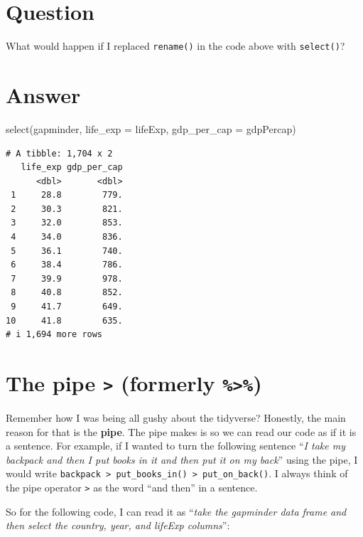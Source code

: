 \documentclass[
  letterpaper,
  DIV=11,
  numbers=noendperiod]{scrreprt}
\newenvironment{Shaded}{\begin{snugshade}}{\end{snugshade}}
\newcommand{\AttributeTok}[1]{\textcolor[rgb]{0.40,0.45,0.13}{#1}}
\newcommand{\FunctionTok}[1]{\textcolor[rgb]{0.28,0.35,0.67}{#1}}
\newcommand{\NormalTok}[1]{\textcolor[rgb]{0.00,0.23,0.31}{#1}}
\begin{document}
\section{Question}

What would happen if I replaced \texttt{rename()} in the code above with
\texttt{select()}?

\section{Answer}

\begin{Shaded}
\begin{Highlighting}[]
\FunctionTok{select}\NormalTok{(gapminder, }\AttributeTok{life\_exp =}\NormalTok{ lifeExp, }\AttributeTok{gdp\_per\_cap =}\NormalTok{ gdpPercap)}
\end{Highlighting}
\end{Shaded}

\begin{verbatim}
# A tibble: 1,704 x 2
   life_exp gdp_per_cap
      <dbl>       <dbl>
 1     28.8        779.
 2     30.3        821.
 3     32.0        853.
 4     34.0        836.
 5     36.1        740.
 6     38.4        786.
 7     39.9        978.
 8     40.8        852.
 9     41.7        649.
10     41.8        635.
# i 1,694 more rows
\end{verbatim}

\section{\texorpdfstring{The pipe \texttt{\textbar{}\textgreater{}}
(formerly
\texttt{\%\textgreater{}\%})}{The pipe \textbar\textgreater{} (formerly \%\textgreater\%)}}\label{the-pipe-formerly}

Remember how I was being all gushy about the tidyverse? Honestly, the
main reason for that is the \textbf{pipe}. The pipe makes is so we can
read our code as if it is a sentence. For example, if I wanted to turn
the following sentence ``\emph{I take my backpack and then I put books
in it and then put it on my back}'' using the pipe, I would write
\texttt{backpack\ \textbar{}\textgreater{}\ put\_books\_in()\ \textbar{}\textgreater{}\ put\_on\_back()}.
I always think of the pipe operator \texttt{\textbar{}\textgreater{}} as
the word ``and then'' in a sentence.

So for the following code, I can read it as ``\emph{take the gapminder
data frame and then select the country, year, and lifeExp columns}'':
\end{document}
